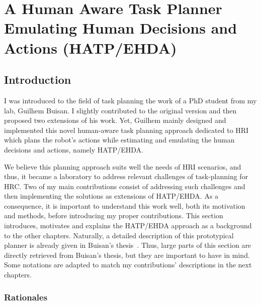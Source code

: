 \ifdefined{}
\else
\setcounter{chapter}{1} %
\dominitoc
\faketableofcontents
\fi

\chapter{A Human Aware Task Planner Emulating Human Decisions and Actions (HATP/EHDA)}
\label{chap:2}
\minitoc

\section{Introduction}

I was introduced to the field of task planning the work of a PhD student from my lab, Guilhem Buisan. I slightly contributed to the original version and then proposed two extensions of his work. Yet, Guilhem mainly designed and implemented this novel human-aware task planning approach dedicated to HRI which plans the robot's actions while estimating and emulating the human decisions and actions, namely HATP/EHDA. 

We believe this planning approach suits well the needs of HRI scenarios, and thus, it became a laboratory to address relevant challenges of task-planning for HRC. 
Two of my main contributions consist of addressing such challenges and then implementing the solutions as extensions of HATP/EHDA.   
As a consequence, it is important to understand this work well, both its motivation and methods, before introducing my proper contributions. This section introduces, motivates and explains the HATP/EHDA approach as a background to the other chapters. 
Naturally, a detailed description of this prototypical planner is already given in Buisan's thesis~\cite{thesisBuisan21}. Thus, large parts of this section are directly retrieved from Buisan's thesis, but they are important to have in mind. Some notations are adapted to match my contributions' descriptions in the next chapters. 

\subsection{Rationales}

